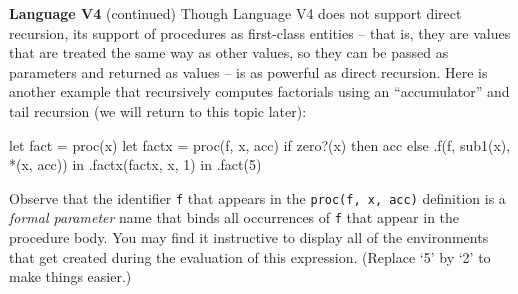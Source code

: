 \begin{minipage}[t]{\sw}
\slidenumber
\LARGE
{\bf Language V4} (continued)\exx
Though Language V4 does not support direct recursion,
its support of procedures as first-class entities --
that is, they are values that are treated
the same way as other values,
so they can be passed as parameters and returned as values --
is as powerful as direct recursion.
Here is another example that recursively computes factorials
using an ``accumulator'' and tail recursion
(we will return to this topic later):
\Large
\begin{qv}
let
  fact = proc(x)
    let
      factx = proc(f, x, acc)
        if zero?(x)
        then acc
        else .f(f, sub1(x), *(x, acc))
    in
      .factx(factx, x, 1)
  in
    .fact(5)
\end{qv}
\LARGE
Observe that the identifier \verb'f' that appears
in the \verb'proc(f, x, acc)' definition
is a {\em formal parameter} name
that binds all occurrences of \verb'f'
that appear in the procedure body.
You may find it instructive to display all of the environments
that get created during the evaluation of this expression.
(Replace `5' by `2' to make things easier.)
\end{minipage}
\clearpage
